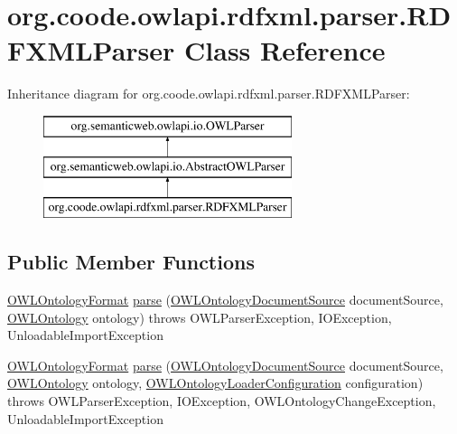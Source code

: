 \hypertarget{classorg_1_1coode_1_1owlapi_1_1rdfxml_1_1parser_1_1_r_d_f_x_m_l_parser}{\section{org.\-coode.\-owlapi.\-rdfxml.\-parser.\-R\-D\-F\-X\-M\-L\-Parser Class Reference}
\label{classorg_1_1coode_1_1owlapi_1_1rdfxml_1_1parser_1_1_r_d_f_x_m_l_parser}
}
Inheritance diagram for org.\-coode.\-owlapi.\-rdfxml.\-parser.\-R\-D\-F\-X\-M\-L\-Parser\-:\begin{figure}[H]
\begin{center}
\leavevmode
\includegraphics[height=3.000000cm]{classorg_1_1coode_1_1owlapi_1_1rdfxml_1_1parser_1_1_r_d_f_x_m_l_parser}
\end{center}
\end{figure}
\subsection*{Public Member Functions}
\begin{DoxyCompactItemize}
\item 
\hyperlink{classorg_1_1semanticweb_1_1owlapi_1_1model_1_1_o_w_l_ontology_format}{O\-W\-L\-Ontology\-Format} \hyperlink{classorg_1_1coode_1_1owlapi_1_1rdfxml_1_1parser_1_1_r_d_f_x_m_l_parser_ac31fe6998b9e5a0bb38e09717b0af739}{parse} (\hyperlink{interfaceorg_1_1semanticweb_1_1owlapi_1_1io_1_1_o_w_l_ontology_document_source}{O\-W\-L\-Ontology\-Document\-Source} document\-Source, \hyperlink{interfaceorg_1_1semanticweb_1_1owlapi_1_1model_1_1_o_w_l_ontology}{O\-W\-L\-Ontology} ontology)  throws O\-W\-L\-Parser\-Exception, I\-O\-Exception, Unloadable\-Import\-Exception 
\item 
\hyperlink{classorg_1_1semanticweb_1_1owlapi_1_1model_1_1_o_w_l_ontology_format}{O\-W\-L\-Ontology\-Format} \hyperlink{classorg_1_1coode_1_1owlapi_1_1rdfxml_1_1parser_1_1_r_d_f_x_m_l_parser_aad6ddc90f0213a8ef6702eb8a20aa5c2}{parse} (\hyperlink{interfaceorg_1_1semanticweb_1_1owlapi_1_1io_1_1_o_w_l_ontology_document_source}{O\-W\-L\-Ontology\-Document\-Source} document\-Source, \hyperlink{interfaceorg_1_1semanticweb_1_1owlapi_1_1model_1_1_o_w_l_ontology}{O\-W\-L\-Ontology} ontology, \hyperlink{classorg_1_1semanticweb_1_1owlapi_1_1model_1_1_o_w_l_ontology_loader_configuration}{O\-W\-L\-Ontology\-Loader\-Configuration} configuration)  throws O\-W\-L\-Parser\-Exception, I\-O\-Exception, O\-W\-L\-Ontology\-Change\-Exception, Unloadable\-Import\-Exception 
\end{DoxyCompactItemize}
